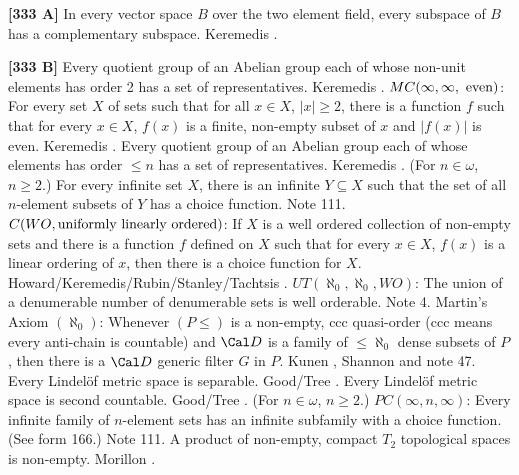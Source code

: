 \smallskip
\item{}{\bf [333 A]} In every vector space $B$ over the two element field,
every subspace of $B$ has a complementary subspace. \ac{Keremedis}
\cite{1996a}.
\smallskip
\item{}{\bf [333 B]} Every quotient group of an Abelian group each of whose
non-unit elements has order 2 has a set of representatives. \ac{Keremedis}
\cite{1996b}.
\medskip
{} $MC(\infty,\infty,\hbox{ even})$: For every
set $X$ of  sets such that for all $x\in X$, $|x|\ge 2$, there is a
function $f$ such that  for every $x\in X$, $f(x)$ is a finite,
non-empty subset of $x$ and $|f(x)|$ is even. \ac{Keremedis}
\cite{1996a}.
\medskip
{} Every quotient group of an Abelian group
each of whose elements has order  $\le n$ has a set of representatives.
\ac{Keremedis} \cite{1996b}.
\medskip
{} (For $n\in\omega$, $n\ge 2$.)  For every
infinite set $X$, there is an infinite $Y \subseteq X$ such that the
set of all $n$-element subsets of $Y$ has a choice function.  Note 111.
\medskip
{} $C(WO,\hbox{uniformly linearly ordered})$:  If
$X$ is a well ordered collection of non-empty sets and there is a function
$f$ defined on $X$ such that for every $x\in X$, $f(x)$ is a linear
ordering of $x$, then there is a choice function for $X$.
\ac{Howard/Keremedis/Rubin/Stanley/Tachtsis} \cite{1999}.
\medskip
{}  $UT(\aleph_0,\aleph_0,WO)$: The union
of a denumerable number of denumerable sets is well orderable.
Note 4.
\medskip
{}  Martin's Axiom $(\aleph_{0})$: Whenever
$(P\le)$ is a non-empty, ccc  quasi-order (ccc means every anti-chain
is countable) and ${\Cal D}$ is a family of $\le\aleph_0$ dense
subsets of $P$, then there is a ${\Cal D}$ generic filter $G$ in $P$.
\ac{Kunen} \cite{1980}, \ac{Shannon} \cite{1990} and note 47.
\medskip
{} Every Lindel\"of metric space is separable.
\ac{Good/Tree} \cite{1995}.
\medskip
{} Every Lindel\"of metric space is second countable.
\ac{Good/Tree} \cite{1995}.
\medskip
{}  (For $n\in\omega$, $n\ge 2$.)
$PC(\infty,n,\infty)$:  Every infinite family of $n$-element sets has
an infinite subfamily with a choice function. (See form 166.) Note 111.
\medskip
{}  A product of non-empty, compact $T_2$
topological spaces is non-empty.  \ac{Morillon} \cite{1988}.
\medskip
